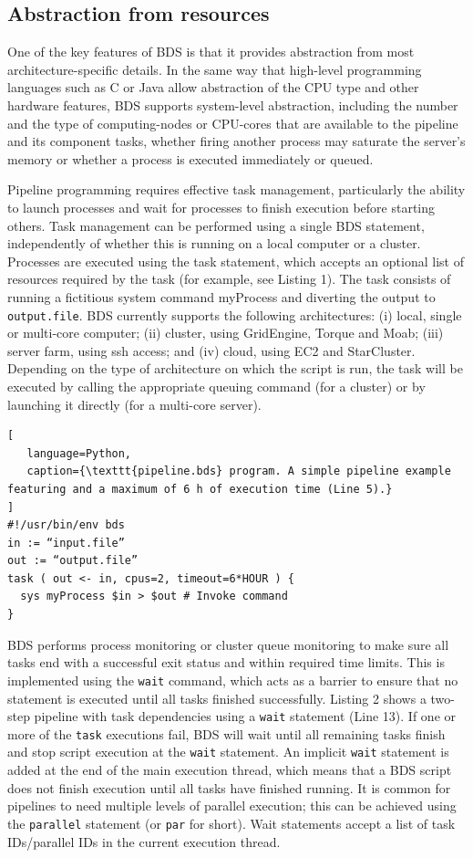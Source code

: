 \subsection{Abstraction from resources}

One of the key features of BDS is that it provides abstraction from most architecture-specific details. In the same way that high-level programming languages such as C or Java allow abstraction of the CPU type and other hardware features, BDS supports system-level abstraction, including the number and the type of computing-nodes or CPU-cores that are available to the pipeline and its component tasks, whether firing another process may saturate the server’s memory or whether a process is executed immediately or queued.

Pipeline programming requires effective task management, particularly the ability to launch processes and wait for processes to finish execution before starting others. Task management can be performed using a single BDS statement, independently of whether this is running on a local computer or a cluster. Processes are executed using the task statement, which accepts an optional list of resources required by the task (for example, see Listing 1). The task consists of running a fictitious system command myProcess and diverting the output to \texttt{output.file}. BDS currently supports the following architectures: (i) local, single or multi-core computer; (ii) cluster, using GridEngine, Torque and Moab; (iii) server farm, using ssh access; and (iv) cloud, using EC2 and StarCluster. Depending on the type of architecture on which the script is run, the task will be executed by calling the appropriate queuing command (for a cluster) or by launching it directly (for a multi-core server).

\begin{lstlisting}[
   language=Python,
   caption={\texttt{pipeline.bds} program. A simple pipeline example featuring and a maximum of 6 h of execution time (Line 5).}
]
#!/usr/bin/env bds
in := “input.file”
out := “output.file”
task ( out <- in, cpus=2, timeout=6*HOUR ) {
  sys myProcess $in > $out # Invoke command
}
\end{lstlisting}

BDS performs process monitoring or cluster queue monitoring to make sure all tasks end with a successful exit status and within required time limits. This is implemented using the \texttt{wait} command, which acts as a barrier to ensure that no statement is executed until all tasks finished successfully. Listing 2 shows a two-step pipeline with task dependencies using a \texttt{wait} statement (Line 13). If one or more of the \texttt{task} executions fail, BDS will wait until all remaining tasks finish and stop script execution at the \texttt{wait} statement. An implicit \texttt{wait} statement is added at the end of the main execution thread, which means that a BDS script does not finish execution until all tasks have finished running. It is common for pipelines to need multiple levels of parallel execution; this can be achieved using the \texttt{parallel} statement (or \texttt{par} for short). Wait statements accept a list of task IDs/parallel IDs in the current execution thread.

